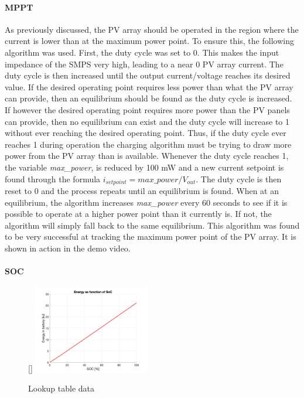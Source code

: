 \documentclass[a4paper]{article}
\begin{document}
\paragraph*{MPPT}
As previously discussed, the PV array should be operated in the region 
where the current is lower than at the maximum power point. To ensure 
this, the following algorithm was used. First, the duty cycle was set 
to 0. This makes the input impedance of the SMPS very high, leading 
to a near 0 PV array current. The duty cycle is then increased until 
the output current/voltage reaches its desired value. If the desired 
operating point requires less power than what the PV array can provide, 
then an equilibrium should be found as the duty cycle is increased. 
If however the desired operating point requires more power than the 
PV panels can provide, then no equilibrium can exist and the duty 
cycle will increase to 1 without ever reaching the desired operating 
point. Thus, if the duty cycle ever reaches 1 during operation the 
charging algorithm must be trying to draw more power from the PV 
array than is available. Whenever the duty cycle reaches 1, the 
variable \emph{max\_power}, is reduced by 100 mW and a new current 
setpoint is found through the 
formula $i_{setpoint} = max\_power / V_{out}$. The duty cycle 
is then reset to 0 and the process repeats until an equilibrium 
is found. When at an equilibrium, the algorithm increases 
\emph{max\_power} every 60 seconds to see if it is possible to 
operate at a higher power point than it currently is. If not, 
the algorithm will simply fall back to the same equilibrium. This 
algorithm was found to be very successful at tracking the maximum 
power point of the PV array. It is shown in action in the demo video.

\paragraph*{SOC}
\begin{figure}
    \centering
    \raisebox{0pt}[\dimexpr{}\baselineskip\relax]{%
        \includegraphics[width=0.45\textwidth]{lookup.png}
    }%
    \vspace{-10pt}
    \caption{Lookup table data}
    \label{fig:lookup}
\end{figure}
\end{document}
